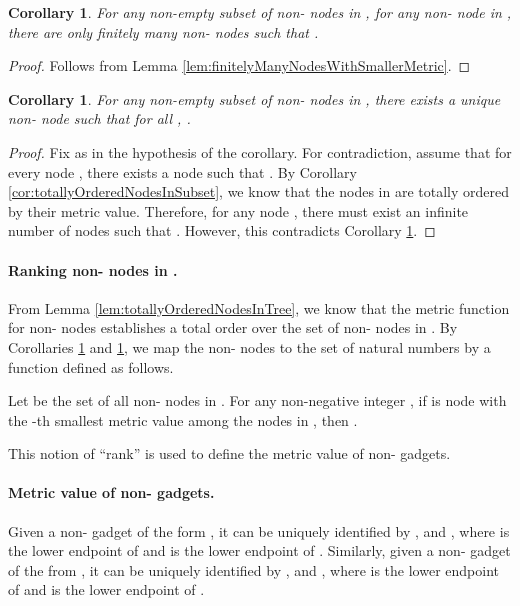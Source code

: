 \documentclass[11pt]{article}
\numberwithin{theorem}{section}
\newtheorem{corollary}[theorem]{Corollary}
\begin{document}
\begin{corollary}\label{cor:finitelyManyNodesWithSmallerMetricInSubset}
For any non-empty subset  of non- nodes in , for any non- node  in , there are only finitely many non- nodes  such that .
\end{corollary}
\begin{proof}
Follows from Lemma \ref{lem:finitelyManyNodesWithSmallerMetric}.
\end{proof}

\begin{corollary}\label{cor:NodesWithSmallestMetricInSubset}
For any non-empty subset  of non- nodes in , there exists a unique non- node  such that for all , .
\end{corollary}
\begin{proof}
Fix  as in the hypothesis of the corollary. For contradiction, assume that for every node , there exists a node  such that . By Corollary \ref{cor:totallyOrderedNodesInSubset}, we know that the nodes in  are totally ordered by their metric value. Therefore, for any node , there must exist an infinite number of nodes  such that . However, this contradicts  Corollary \ref{cor:finitelyManyNodesWithSmallerMetricInSubset}.
\end{proof}

\paragraph{Ranking non- nodes in .}
From Lemma \ref{lem:totallyOrderedNodesInTree}, we know that the metric function  for non- nodes establishes a total order over the set of non- nodes in . By Corollaries \ref{cor:finitelyManyNodesWithSmallerMetricInSubset} and  \ref{cor:NodesWithSmallestMetricInSubset}, we map the non- nodes to the set of natural numbers by a function  defined as follows.

Let  be the set of all non- nodes in .
For any non-negative integer , if  is node with the -th smallest metric value among the nodes in , then . 

This notion of ``rank'' is used to define the metric value of non- gadgets.

\paragraph{Metric value of non- gadgets.} 
Given a non- gadget of the form , it can be uniquely identified by ,  and , where  is the lower endpoint of  and  is the lower endpoint of . Similarly, given a non- gadget of the from , it can be uniquely identified by ,  and , where  is the lower endpoint of  and  is the lower endpoint of .
\end{document}
